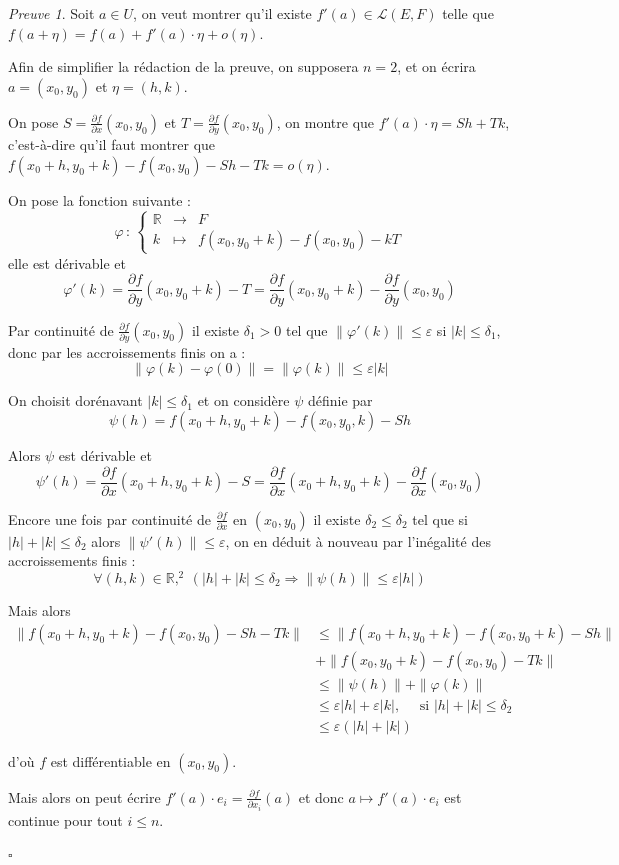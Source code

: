 \documentclass[]{article}
\theoremstyle{remark}
\newtheorem{myproof}{Preuve}
\theoremstyle{definition}
\newcommand{\cqfd}{
	\hfill$\square$
}
\newcommand{\func}[5]{
#1 \, : \, \left\{ \begin{array}{lcl}
	#2 & \longrightarrow & #3 \\
	#4 & \longmapsto & #5
\end{array}
\right.
}
\begin{document}
\begin{myproof}
	Soit $a \in U$, on veut montrer qu'il existe $f'(a) \in \mathcal{L}(E, F)$ telle que $f(a + \eta) = f(a) + f'(a) \cdot \eta + o(\eta)$.
	
	Afin de simplifier la rédaction de la preuve, on supposera $n = 2$, et on écrira $a = (x_0, y_0)$ et $\eta = (h, k)$. 
	
	On pose $\displaystyle S = \frac{\partial f}{\partial x}(x_0, y_0)$ et $T = \frac{\partial f}{\partial y}(x_0, y_0)$, on montre que $f'(a) \cdot \eta = Sh + Tk$, c'est-à-dire qu'il faut montrer que $f(x_0 + h, y_0 + k) - f(x_0, y_0) - Sh - Tk = o(\eta)$.
	
	On pose la fonction suivante : $$\func{\varphi}{\mathbb{R}}{F}{k}{f(x_0, y_0 + k) - f(x_0, y_0) - kT}$$
	elle est dérivable et $$\varphi'(k) = \frac{\partial f}{\partial y}(x_0, y_0 + k) - T = \frac{\partial f}{\partial y} (x_0, y_0 + k) - \frac{\partial f}{\partial y} (x_0, y_0)$$
	
	Par continuité de $\displaystyle \frac{\partial f}{\partial y}(x_0, y_0)$ il existe $\delta_1 > 0$ tel que $\|\varphi'(k)\| \leqslant \varepsilon$ si $|k| \leqslant \delta_1$, donc par les accroissements finis on a : $$\|\varphi(k) -\varphi(0)\| = \|\varphi(k)\| \leqslant\varepsilon |k|$$
	
	On choisit dorénavant $|k| \leqslant \delta_1$ et on considère $\psi$ définie par $$\psi(h) = f(x_0+h, y_0+k) - f(x_0, y_0, k) - Sh$$
	
	Alors $\psi$ est dérivable et $$\psi'(h) = \frac{\partial f}{\partial x}(x_0+h, y_0+k) - S = \frac{\partial f}{\partial x}(x_0 + h, y_0 + k) - \frac{\partial f}{\partial x}(x_0, y_0)$$
	
	Encore une fois par continuité de $\displaystyle \frac{\partial f}{\partial x}$ en $(x_0, y_0)$ il existe $\delta_2 \leqslant \delta_2$ tel que si $|h| + |k| \leqslant \delta_2$ alors $\|\psi'(h)\| \leqslant \varepsilon$, on en déduit à nouveau par l'inégalité des accroissements finis : $$\forall (h, k) \in \mathbb{R},^2 ~ (|h|+|k| \leqslant \delta_2 \Longrightarrow \|\psi(h)\| \leqslant \varepsilon |h|)$$
	
	Mais alors $$\begin{aligned}
		\|f(x_0+h, y_0+k) - f(x_0, y_0) - Sh - Tk\| &\leqslant \|f(x_0 + h, y_0 + k) - f(x_0, y_0 + k) - Sh\| \\ &+ \|f(x_0, y_0+k) - f(x_0, y_0) - Tk\|\\
		& \leqslant \|\psi(h)\| + \|\varphi(k)\| \\
		& \leqslant \varepsilon|h| + \varepsilon|k|, \quad \text{ si $|h| + |k| \leqslant \delta_2$} \\
		& \leqslant \varepsilon(|h|+|k|)
	\end{aligned}$$
	
	d'où $f$ est différentiable en $(x_0, y_0)$.
	
	Mais alors on peut écrire $f'(a) \cdot e_i = \frac{\partial f}{\partial x_i}(a)$ et donc $a \mapsto f'(a) \cdot e_i$ est continue pour tout $i \leqslant n$.
	
	\cqfd
\end{myproof}
\end{document}
